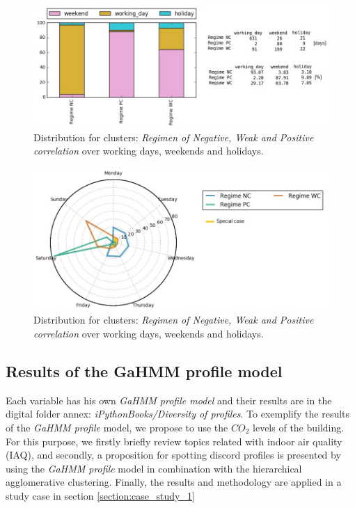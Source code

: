 \begin{figure}[h!]
  \vspace{0.5em} %
  \includegraphics[scale=0.65]{Figures/Distribution_daily.jpg}
  \caption{Distribution for clusters: \textit{Regimen of Negative, Weak and Positive correlation} over working days, weekends and holidays.}
  \label{fig:daily_distribution}
\end{figure}


\begin{figure}[h!]
  \vspace{0.5em} %
  \includegraphics[scale=0.65]{Figures/Interactional_cluster_daily_distribution.jpg}
  \caption{Distribution for clusters: \textit{Regimen of Negative, Weak and Positive correlation} over working days, weekends and holidays.}
  \label{fig:r_distribution}
\end{figure}


\subsection{Results of the GaHMM profile model}
\label{sec:profile_results}

Each variable has his own \textit{GaHMM profile model} and their results are in the digital folder annex: \textit{iPythonBooks/Diversity of profiles}. To exemplify the results of the \textit{GaHMM profile} model, we propose to use the $CO_2$ levels of the building. For this purpose, we firstly briefly review topics related with indoor air quality (IAQ), and secondly, a proposition for spotting discord profiles is presented by using the \textit{GaHMM profile} model in combination with the hierarchical agglomerative clustering. Finally, the results and methodology are applied in a study case in section \ref{section:case_study_1}  

